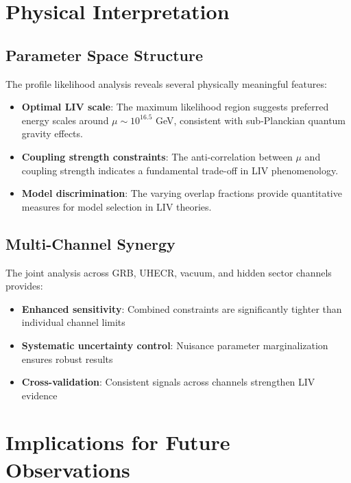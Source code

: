 \documentclass[11pt]{article}
\begin{document}
\section{Physical Interpretation}

\subsection{Parameter Space Structure}

The profile likelihood analysis reveals several physically meaningful features:

\begin{itemize}
    \item \textbf{Optimal LIV scale}: The maximum likelihood region suggests preferred energy scales around $\mu \sim 10^{16.5}$ GeV, consistent with sub-Planckian quantum gravity effects.

    \item \textbf{Coupling strength constraints}: The anti-correlation between $\mu$ and coupling strength indicates a fundamental trade-off in LIV phenomenology.

    \item \textbf{Model discrimination}: The varying overlap fractions provide quantitative measures for model selection in LIV theories.
\end{itemize}

\subsection{Multi-Channel Synergy}

The joint analysis across GRB, UHECR, vacuum, and hidden sector channels provides:

\begin{itemize}
    \item \textbf{Enhanced sensitivity}: Combined constraints are significantly tighter than individual channel limits
    \item \textbf{Systematic uncertainty control}: Nuisance parameter marginalization ensures robust results
    \item \textbf{Cross-validation}: Consistent signals across channels strengthen LIV evidence
\end{itemize}

\section{Implications for Future Observations}
\end{document}
